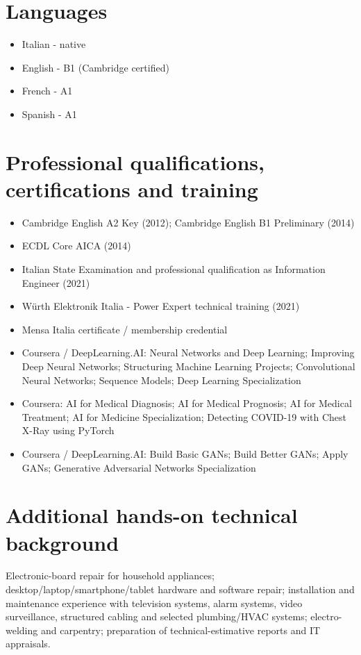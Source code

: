 \documentclass[10pt,a4paper]{article}
\begin{document}
\section{Languages}
\begin{itemize}
\item Italian - native
\item English - B1 (Cambridge certified)
\item French - A1
\item Spanish - A1
\end{itemize}

\section{Professional qualifications, certifications and training}
\begin{itemize}
\item Cambridge English A2 Key (2012); Cambridge English B1 Preliminary (2014)
\item ECDL Core AICA (2014)
\item Italian State Examination and professional qualification as Information Engineer (2021)
\item Würth Elektronik Italia - Power Expert technical training (2021)
\item Mensa Italia certificate / membership credential
\item Coursera / DeepLearning.AI: Neural Networks and Deep Learning; Improving Deep Neural Networks; Structuring Machine Learning Projects; Convolutional Neural Networks; Sequence Models; Deep Learning Specialization
\item Coursera: AI for Medical Diagnosis; AI for Medical Prognosis; AI for Medical Treatment; AI for Medicine Specialization; Detecting COVID-19 with Chest X-Ray using PyTorch
\item Coursera / DeepLearning.AI: Build Basic GANs; Build Better GANs; Apply GANs; Generative Adversarial Networks Specialization
\end{itemize}

\section{Additional hands-on technical background}
\color{BodyGrey}
Electronic-board repair for household appliances; desktop/laptop/smartphone/tablet hardware and software repair; installation and maintenance experience with television systems, alarm systems, video surveillance, structured cabling and selected plumbing/HVAC systems; electro-welding and carpentry; preparation of technical-estimative reports and IT appraisals.
\color{black}
\end{document}
